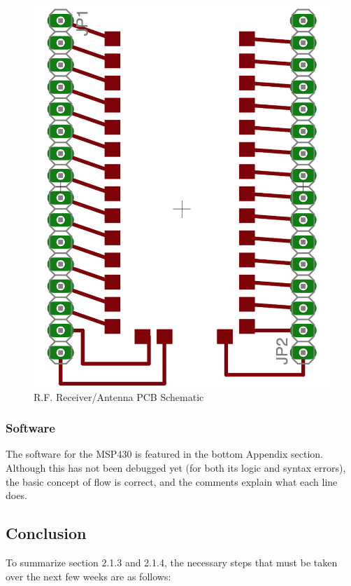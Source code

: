 \documentclass[letterpaper,10pt]{article}
\begin{document}
\begin{spacing}{1.15}
\begin{figure} [H]
	\centering
	\includegraphics[scale=0.3]{kh3-receiver-breakout.png}
	\caption{R.F. Receiver/Antenna PCB Schematic\label{fig:receiver-breakout}}
\end{figure}


\subsubsection{Software} \label{section-software}
The software for the MSP430 is featured in the bottom Appendix section. Although this has not been debugged yet (for both its logic and syntax errors), the basic concept of flow is correct, and the comments explain what each line does. 


\subsection{Conclusion}
To summarize section 2.1.3 and 2.1.4, the necessary steps that must be taken over the next few weeks are as follows:


\end{spacing}
\end{document}
